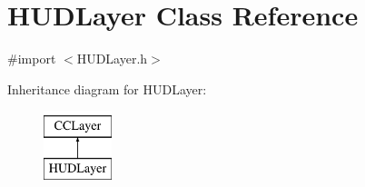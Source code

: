 \hypertarget{interface_h_u_d_layer}{\section{H\-U\-D\-Layer Class Reference}
\label{d3/d8a/interface_h_u_d_layer}
}


{\ttfamily \#import $<$H\-U\-D\-Layer.\-h$>$}

Inheritance diagram for H\-U\-D\-Layer\-:\begin{figure}[H]
\begin{center}
\leavevmode
\includegraphics[height=2.000000cm]{d3/d8a/interface_h_u_d_layer}
\end{center}
\end{figure}
